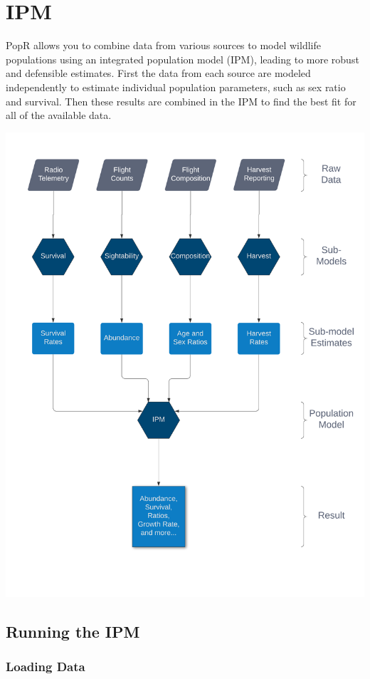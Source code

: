 \documentclass[
]{book}
\begin{document}
\hypertarget{ipm}{%
\chapter{IPM}\label{ipm}}

PopR allows you to combine data from various sources to model wildlife populations using an integrated population model (IPM), leading to more robust and defensible estimates. First the data from each source are modeled independently to estimate individual population parameters, such as sex ratio and survival. Then these results are combined in the IPM to find the best fit for all of the available data.

\includegraphics{./www/ipm_flowchart.PNG}

\hypertarget{ipm-model}{%
\section{Running the IPM}\label{ipm-model}}

\hypertarget{ipm-load}{%
\subsection{Loading Data}\label{ipm-load}}
\end{document}
